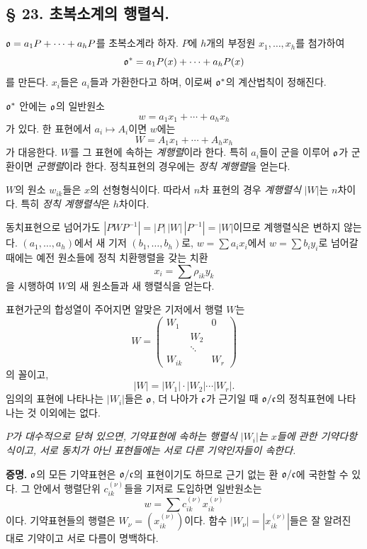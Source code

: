 \subsection*{§ 23. 초복소계의 행렬식.}

\(\mathfrak o=a_1P+\cdots+a_hP\)를 초복소계라 하자. \(P\)에 \(h\)개의 부정원 \(x_1,\ldots,x_h\)를 첨가하여
\[
        \mathfrak o^*=a_1P(x)+\cdots+a_hP(x)
\]
를 만든다. \(x_i\)들은 \(a_i\)들과 가환한다고 하며, 이로써 \(\mathfrak o^*\)의 계산법칙이 정해진다.

\(\mathfrak o^*\) 안에는 \glqq{}\(\mathfrak o\)의 일반원소\grqq{}
\[
        w=a_1x_1+\cdots+a_hx_h
\]
가 있다. 한 표현에서 \(a_i\mapsto A_i\)이면 \(w\)에는
\[
        W=A_1x_1+\cdots+A_hx_h
\]
가 대응한다. \(W\)를 그 표현에 속하는 \emph{계행렬}이라 한다. 특히 \(a_i\)들이 군을 이루어 \(\mathfrak o\)가 군환이면 \emph{군행렬}이라 한다. 정칙표현의 경우에는 \emph{정칙 계행렬}을 얻는다.

\(W\)의 원소 \(w_{ik}\)들은 \(x\)의 선형형식이다. 따라서 \(n\)차 표현의 경우 \glqq{}\emph{계행렬식}\grqq{} \(|W|\)는 \(n\)차이다. 특히 \emph{정칙 계행렬식}은 \(h\)차이다.

동치표현으로 넘어가도 \(|PWP^{-1}|=|P|\,|W|\,|P^{-1}|=|W|\)이므로 계행렬식은 변하지 않는다. \((a_1,\ldots,a_h)\)에서 새 기저 \((b_1,\ldots,b_h)\)로, \(w=\sum a_ix_i\)에서 \(w=\sum b_iy_i\)로 넘어갈 때에는 예전 원소들에 정칙 치환행렬을 갖는 치환
\[
        x_i=\sum \rho_{ik}y_k
\]
을 시행하여 \(W\)의 새 원소들과 새 행렬식을 얻는다.

표현가군의 합성열이 주어지면 알맞은 기저에서 행렬 \(W\)는
\[
        W=\begin{pmatrix}
        W_1&&0\\
        &W_2&\\
        &\ddots&\\
        W_{ik}&&W_r
        \end{pmatrix}
\]
의 꼴이고,
\[
        |W|=|W_1|\cdot|W_2|\cdots|W_r|.
\]
임의의 표현에 나타나는 \(|W_i|\)들은 \(\mathfrak o\), 더 나아가 \(\mathfrak c\)가 근기일 때 \(\mathfrak o/\mathfrak c\)의 정칙표현에 나타나는 것 이외에는 없다.

\emph{\(P\)가 대수적으로 닫혀 있으면, 기약표현에 속하는 행렬식 \(|W_i|\)는 \(x\)들에 관한 기약다항식이고, 서로 동치가 아닌 표현들에는 서로 다른 기약인자들이 속한다.}

\textbf{증명.} \(\mathfrak o\)의 모든 기약표현은 \(\mathfrak o/\mathfrak c\)의 표현이기도 하므로 근기 없는 환 \(\mathfrak o/\mathfrak c\)에 국한할 수 있다. 그 안에서 행렬단위 \(c_{ik}^{(\nu)}\)들을 기저로 도입하면 일반원소는
\[
        w=\sum c_{ik}^{(\nu)}x_{ik}^{(\nu)}
\]
이다. 기약표현들의 행렬은 \(W_\nu=(x_{ik}^{(\nu)})\)이다. 함수 \(|W_\nu|=|x_{ik}^{(\nu)}|\)들은 잘 알려진 대로 기약이고 서로 다름이 명백하다.

